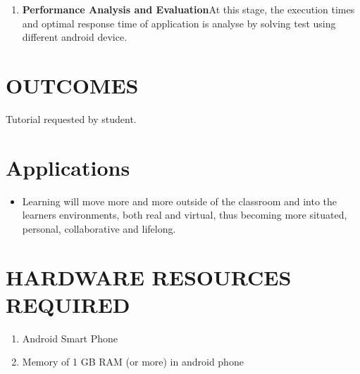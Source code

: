 \documentclass[oneside,a4paper,12pt]{report}
\begin{document}
{\begin{enumerate}
\item \textbf{Performance Analysis and Evaluation}At this stage, the execution
times and optimal response time of application is analyse by solving
test using different android device.

\end{enumerate}

\section{OUTCOMES}
\hspace*{0.3in}Tutorial requested by student.\\

\section{Applications}
\begin{itemize}
\item Learning will move more and more outside of the classroom and into
the learners environments, both real and virtual, thus becoming more
situated, personal, collaborative and lifelong.
\end{itemize}



\section{HARDWARE RESOURCES REQUIRED}
\begin{enumerate}
\item Android Smart  Phone
\item Memory of 1 GB RAM (or more) in android  phone
\end{enumerate}}
\end{document}
